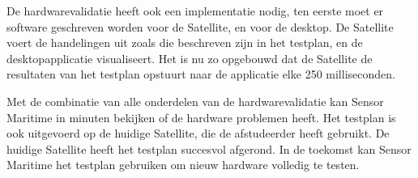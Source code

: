 \noindent De hardwarevalidatie heeft ook een implementatie nodig, ten eerste moet er software geschreven worden voor de Satellite, en voor de desktop. De Satellite voert de handelingen uit zoals die beschreven zijn in het testplan, en de desktopapplicatie visualiseert. Het is nu zo opgebouwd dat de Satellite de resultaten van het testplan opstuurt naar de applicatie elke 250 milliseconden. \newline

\noindent Met de combinatie van alle onderdelen van de hardwarevalidatie kan Sensor Maritime in minuten bekijken of de hardware problemen heeft. Het testplan is ook uitgevoerd op de huidige Satellite, die de afstudeerder heeft gebruikt. De huidige Satellite heeft het testplan succesvol afgerond. In de toekomst kan Sensor Maritime het testplan gebruiken om nieuw hardware volledig te testen. 

\newpage

